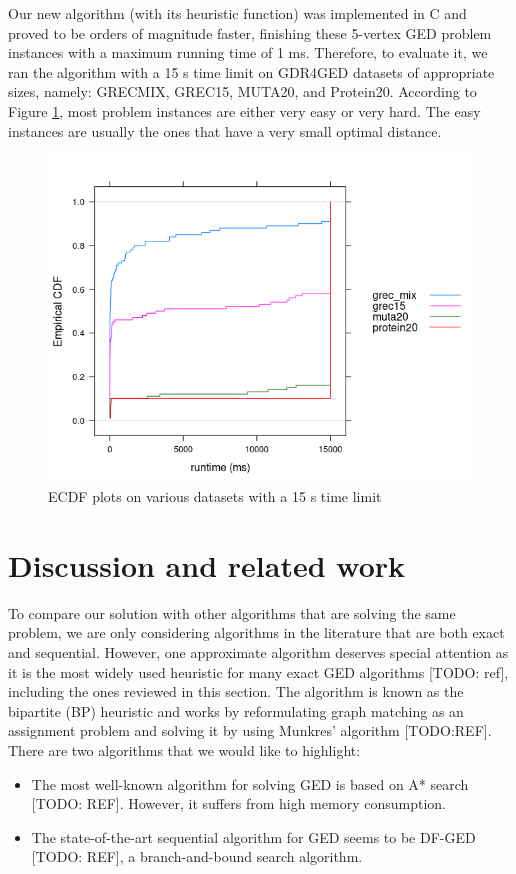 \documentclass{article}
\theoremstyle{definition}
\begin{document}
Our new algorithm (with its heuristic function) was implemented in C and proved to be orders of magnitude faster, finishing these 5-vertex GED problem instances with a maximum running time of 1 ms. Therefore, to evaluate it, we ran the algorithm with a 15 s time limit on GDR4GED datasets of appropriate sizes, namely: GRECMIX, GREC15, MUTA20, and Protein20. According to Figure \ref{fig:ecdf}, most problem instances are either very easy or very hard. The easy instances are usually the ones that have a very small optimal distance.
\begin{figure}
  \includegraphics[scale=0.75]{ecdfs.png}
  \caption{ECDF plots on various datasets with a 15 s time limit}
  \label{fig:ecdf}
\end{figure}
\section{Discussion and related work}
To compare our solution with other algorithms that are solving the same problem, we are only considering algorithms in the literature that are both exact and sequential. However, one approximate algorithm deserves special attention as it is the most widely used heuristic for many exact GED algorithms [TODO: ref], including the ones reviewed in this section. The algorithm is known as the bipartite (BP) heuristic and works by reformulating graph matching as an assignment problem and solving it by using Munkres' algorithm [TODO:REF]. There are two algorithms that we would like to highlight:
\begin{itemize}
\item The most well-known algorithm for solving GED is based on A* search [TODO: REF]. However, it suffers from high memory consumption.
\item The state-of-the-art sequential algorithm for GED seems to be DF-GED [TODO: REF], a branch-and-bound search algorithm.
\end{itemize}
\end{document}
